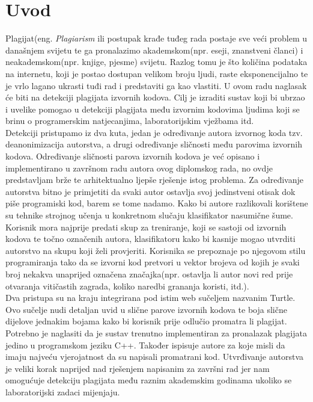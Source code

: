 \chapter*{Uvod}

	Plagijat(eng. \textit{Plagiarism} ili postupak krađe tuđeg rada postaje sve veći problem u današnjem svijetu te ga pronalazimo akademskom(npr. eseji, znanstveni članci) i neakademskom(npr. knjige, pjesme) svijetu. Razlog tomu je što količina podataka na internetu, koji je postao dostupan velikom broju ljudi, raste eksponencijalno te je vrlo lagano ukrasti tuđi rad i predstaviti ga kao vlastiti. U ovom radu naglasak će biti na detekciji plagijata izvornih kodova. Cilj je izraditi sustav koji bi ubrzao i uvelike pomogao u detekciji plagijata među izvornim kodovima ljudima koji se brinu o programerskim natjecanjima, laboratorijskim vježbama itd. \\

	Detekciji pristupamo iz dva kuta, jedan je određivanje autora izvornog koda tzv. deanonimizacija autorstva, a drugi određivanje sličnosti među parovima izvornih kodova.   Određivanje sličnosti parova izvornih kodova je već opisano i implementirano u završnom radu autora ovog diplomskog rada, no ovdje predstavljam brže te arhitektualno ljepše rješenje istog problema. Za određivanje autorstva bitno je primjetiti da svaki autor ostavlja svoj jedinstveni otisak dok piše programiski kod, barem se tome nadamo. Kako bi autore razlikovali korištene su tehnike strojnog učenja u konkretnom slučaju klasifikator nasumične šume. Korisnik mora najprije predati skup za treniranje, koji se sastoji od izvornih kodova te točno označenih autora, klasifikatoru kako bi kasnije mogao utvrditi autorstvo na skupu koji želi provjeriti. Korisnika se prepoznaje po njegovom stilu programiranja tako da se izvorni kod pretvori u vektor brojeva od kojih je svaki broj nekakva unaprijed označena značajka(npr. ostavlja li autor novi red prije otvaranja vitičastih zagrada, koliko naredbi grananja koristi, itd.). \\

	Dva pristupa su na kraju integrirana pod istim web sučeljem nazvanim Turtle. Ovo sučelje nudi detaljan uvid u slične parove izvornih kodova te boja slične dijelove jednakim bojama kako bi korisnik prije odlučio promatra li plagijat. 
\newpage
{}	
\noindent Potrebno je naglasiti da je sustav trenutno implementiran za pronalazak plagijata jedino u programskom jeziku C++. Također ispisuje autore za koje misli da imaju najveću vjerojatnost da su napisali promatrani kod. Utvrđivanje autorstva je veliki korak naprijed nad rješenjem napisanim za završni rad jer nam omogućuje detekciju plagijata među raznim akademskim godinama ukoliko se laboratorijski zadaci mijenjaju.

